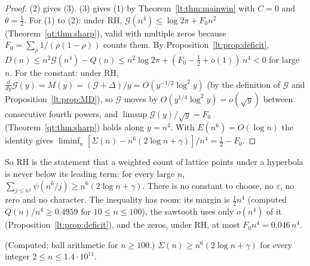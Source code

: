 \begin{proof}
(2) gives (3). (3) gives (1) by Theorem~\ref{lt:thm:mainwin} with $C=0$ and $\theta=\tfrac12$. For (1) to (2): under RH, $\mathcal G(n^4)\le\log2\pi+F_0n^2$ (Theorem~\ref{qt:thm:sharp}), valid with multiple zeros because $F_0=\sum_\rho1/(\rho(1-\rho))$ counts them. By Proposition~\ref{lt:prop:deficit}, $D(n)\le n^2\mathcal G(n^4)-Q(n)\le n^2\log2\pi+(F_0-\tfrac12+o(1))\,n^4<0$ for large $n$. For the constant: under RH, $\frac{d}{dy}\mathcal G(y)=M(y)=(\mathcal G+\Delta)/y=O(y^{-1/2}\log^2y)$ (by the definition of $\mathcal G$ and Proposition~\ref{lt:prop:MD}), so $\mathcal G$ moves by $O(y^{1/4}\log^2y)=o(\sqrt y)$ between consecutive fourth powers, and $\limsup\mathcal G(y)/\sqrt y=F_0$ (Theorem~\ref{qt:thm:sharp}) holds along $y=n^4$. With $E(n^6)=O(\log n)$ the identity gives $\liminf_n[\Sigma(n)-n^6(2\log n+\gamma)]/n^4=\tfrac12-F_0$.
\end{proof}

So RH is the statement that a weighted count of lattice points under a hyperbola is never below its leading term: for every large $n$, $\sum_{j\le n^2}\psi(n^6/j)\ge n^6(2\log n+\gamma)$. There is no constant to choose, no $\varepsilon$, no zero and no character. The inequality has room: its margin is $\tfrac12n^4$ (computed $Q(n)/n^4\ge0.4959$ for $10\le n\le100$), the sawtooth uses only $o(n^4)$ of it (Proposition~\ref{lt:prop:deficit}), and the zeros, under RH, at most $F_0n^4=0.046\,n^4$.

\begin{theorem}\label{lt:thm:cleanrange}
(Computed; ball arithmetic for $n\ge100$.) $\Sigma(n)\ge n^6(2\log n+\gamma)$ for every integer $2\le n\le1.4\cdot10^{11}$.
\end{theorem}

